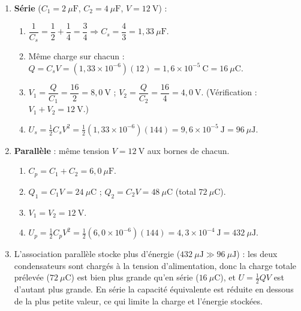 \documentclass[11pt]{article}
\begin{document}
\begin{corrige}
\begin{enumerate}
\item \textbf{Série} ($C_1 = 2\ \mu\mathrm{F}$, $C_2 = 4\ \mu\mathrm{F}$, $V = 12\ \mathrm{V}$) :
\begin{enumerate}
\item $\dfrac{1}{C_s} = \dfrac{1}{2} + \dfrac{1}{4} = \dfrac{3}{4} \Rightarrow C_s = \dfrac{4}{3} = 1,33\ \mu\mathrm{F}$.
\item Même charge sur chacun : $Q = C_s V = (1,33\times10^{-6})(12) = 1,6\times10^{-5}\ \mathrm{C} = 16\ \mu\mathrm{C}$.
\item $V_1 = \dfrac{Q}{C_1} = \dfrac{16}{2} = 8,0\ \mathrm{V}$ ; \quad $V_2 = \dfrac{Q}{C_2} = \dfrac{16}{4} = 4,0\ \mathrm{V}$. (Vérification : $V_1 + V_2 = 12\ \mathrm{V}$.)
\item $U_s = \tfrac{1}{2}C_s V^2 = \tfrac{1}{2}(1,33\times10^{-6})(144) = 9,6\times10^{-5}\ \mathrm{J} = 96\ \mu\mathrm{J}$.
\end{enumerate}
\item \textbf{Parallèle} : même tension $V = 12\ \mathrm{V}$ aux bornes de chacun.
\begin{enumerate}
\item $C_p = C_1 + C_2 = 6,0\ \mu\mathrm{F}$.
\item $Q_1 = C_1 V = 24\ \mu\mathrm{C}$ ; \quad $Q_2 = C_2 V = 48\ \mu\mathrm{C}$ (total $72\ \mu\mathrm{C}$).
\item $V_1 = V_2 = 12\ \mathrm{V}$.
\item $U_p = \tfrac{1}{2}C_p V^2 = \tfrac{1}{2}(6,0\times10^{-6})(144) = 4,3\times10^{-4}\ \mathrm{J} = 432\ \mu\mathrm{J}$.
\end{enumerate}
\item L'association parallèle stocke plus d'énergie ($432\ \mu\mathrm{J} \gg 96\ \mu\mathrm{J}$) : les deux condensateurs sont chargés à la tension d'alimentation, donc la charge totale prélevée ($72\ \mu\mathrm{C}$) est bien plus grande qu'en série ($16\ \mu\mathrm{C}$), et $U = \tfrac{1}{2}QV$ est d'autant plus grande. En série la capacité équivalente est réduite en dessous de la plus petite valeur, ce qui limite la charge et l'énergie stockées.
\end{enumerate}
\end{corrige}
\end{document}
